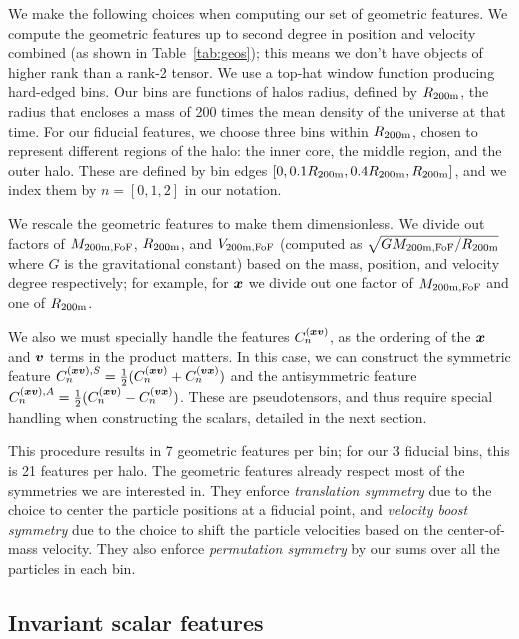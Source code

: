 We make the following choices when computing our set of geometric features.
We compute the geometric features up to second degree in position and velocity combined (as shown in Table~\ref{tab:geos}); this means we don't have objects of higher rank than a rank-2 tensor.
We use a top-hat window function producing hard-edged bins. 
Our bins are functions of halos radius, defined by $R_\mathrm{200m}$, the radius that encloses a mass of 200 times the mean density of the universe at that time.
For our fiducial features, we choose three bins within $R_\mathrm{200m}$, chosen to represent different regions of the halo: the inner core, the middle region, and the outer halo.
These are defined by bin edges $[0, 0.1R_\mathrm{200m}, 0.4R_\mathrm{200m}, R_\mathrm{200m}]$, and we index them by $n=[0,1,2]$ in our notation.

We rescale the geometric features to make them dimensionless.
We divide out factors of $M_\mathrm{200m,FoF}$, $R_\mathrm{200m}$, and $V_\mathrm{200m,FoF}$ (computed as $\sqrt{GM_\mathrm{200m,FoF}/R_\mathrm{200m}}$ where $G$ is the gravitational constant) based on the mass, position, and velocity degree respectively; for example, for $\bm{x}$ we divide out one factor of $M_\mathrm{200m,FoF}$ and one of $R_\mathrm{200m}$.

We also we must specially handle the features $C^{(\bm{x}\bm{v})}_n$, as the ordering of the $\bm{x}$ and $\bm{v}$ terms in the product matters.
In this case, we can construct the symmetric feature $ C^{(\bm{x}\bm{v}),S}_n = \frac{1}{2} (C^{(\bm{x}\bm{v})}_n + C^{(\bm{v}\bm{x})}_n)$ and the antisymmetric feature $C^{(\bm{x}\bm{v}),A}_n = \frac{1}{2} (C^{(\bm{x}\bm{v})}_n - C^{(\bm{v}\bm{x})}_n)$.
These are pseudotensors, and thus require special handling when constructing the scalars, detailed in the next section.

This procedure results in 7 geometric features per bin; for our 3 fiducial bins, this is 21 features per halo.
The geometric features already respect most of the symmetries we are interested in.
They enforce \emph{translation symmetry} due to the choice to center the particle positions at a fiducial point, and \emph{velocity boost symmetry} due to the choice to shift the particle velocities based on the center-of-mass velocity.  
They also enforce \emph{permutation symmetry} by our sums over all the particles in each bin.


\subsection{Invariant scalar features}
\label{sec:scalar_features}

